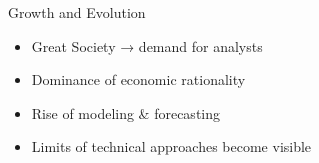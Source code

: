 \documentclass[10pt]{beamer}
\begin{document}
\begin{frame}{Growth and Evolution}

\begin{block}{}
    \begin{itemize}
        \item Great Society → demand for analysts
        \item Dominance of economic rationality
        \item Rise of modeling \& forecasting
        \item Limits of technical approaches become visible
    \end{itemize}
\end{block}

\end{frame}
\end{document}

